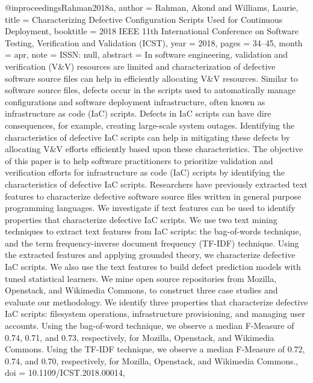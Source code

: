 
@inproceedings{Rahman2018a,
  author    = {Rahman, Akond and Williams, Laurie},
  title     = {Characterizing {Defective} {Configuration} {Scripts} {Used} for {Continuous} {Deployment}},
  booktitle = {2018 {IEEE} 11th {International} {Conference} on {Software} {Testing}, {Verification} and {Validation} ({ICST})},
  year      = {2018},
  pages     = {34--45},
  month     = apr,
  note      = {ISSN: null},
  abstract  = {In software engineering, validation and verification (V\&V) resources are limited and characterization of defective software source files can help in efficiently allocating V\&V resources. Similar to software source files, defects occur in the scripts used to automatically manage configurations and software deployment infrastructure, often known as infrastructure as code (IaC) scripts. Defects in IaC scripts can have dire consequences, for example, creating large-scale system outages. Identifying the characteristics of defective IaC scripts can help in mitigating these defects by allocating V\&V efforts efficiently based upon these characteristics. The objective of this paper is to help software practitioners to prioritize validation and verification efforts for infrastructure as code (IaC) scripts by identifying the characteristics of defective IaC scripts. Researchers have previously extracted text features to characterize defective software source files written in general purpose programming languages. We investigate if text features can be used to identify properties that characterize defective IaC scripts. We use two text mining techniques to extract text features from IaC scripts: the bag-of-words technique, and the term frequency-inverse document frequency (TF-IDF) technique. Using the extracted features and applying grounded theory, we characterize defective IaC scripts. We also use the text features to build defect prediction models with tuned statistical learners. We mine open source repositories from Mozilla, Openstack, and Wikimedia Commons, to construct three case studies and evaluate our methodology. We identify three properties that characterize defective IaC scripts: filesystem operations, infrastructure provisioning, and managing user accounts. Using the bag-of-word technique, we observe a median F-Measure of 0.74, 0.71, and 0.73, respectively, for Mozilla, Openstack, and Wikimedia Commons. Using the TF-IDF technique, we observe a median F-Measure of 0.72, 0.74, and 0.70, respectively, for Mozilla, Openstack, and Wikimedia Commons.},
  doi       = {10.1109/ICST.2018.00014},
}
